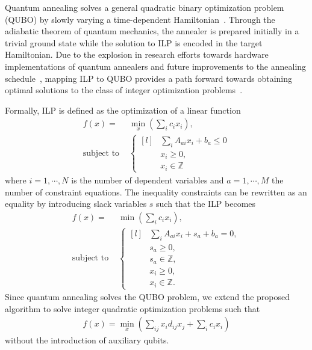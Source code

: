 \documentclass[prd,twocolumn,tightenlines,preprintnumbers,showpacs,superscriptaddress,notitlepage,nofootinbib,eqsecnum,
floatfix,longbibliography,aps,10pt]{revtex4-2}
\begin{document}
Quantum annealing solves a general quadratic binary optimization problem (QUBO) by slowly varying a time-dependent Hamiltonian~\cite{}. Through the adiabatic theorem of quantum mechanics, the annealer is prepared initially in a trivial ground state while the solution to ILP is encoded in the target Hamiltonian. Due to the explosion in research efforts towards hardware implementations of quantum annealers and future improvements to the annealing schedule~\cite{}, mapping ILP to QUBO provides a path forward towards obtaining optimal solutions to the class of integer optimization problems~\cite{2018Glover}.

Formally, ILP is defined as the optimization of a linear function
\begin{align}
f(x) = &\min\limits_{x}(\sum_i c_i x_i),\\
\textrm{subject to } &\left \{
\begin{matrix*}[l]
	&\sum_i A_{ai}x_i +b_a \leq 0 \\
	&x_i \geq 0,\\
	&x_i \in \mathbb{Z}
\end{matrix*} \right.
\end{align}
where $i=1, \cdots,  N$ is the number of dependent variables and $a=1, \cdots, M$ the number of constraint equations. The inequality constraints can be rewritten as an equality by introducing slack variables $s$ such that the ILP becomes
\begin{align}
f(x) = &\min(\sum_i c_i x_i),\\
\textrm{subject to } &\left \{
\begin{matrix*}[l]
	&\sum_i A_{a i}x_i + s_a + b_a = 0,\\
	&s_a \geq 0,\\
	&s_a \in \mathbb{Z},\\
	&x_i \geq 0,\\
	&x_i \in \mathbb{Z}.
\end{matrix*} \right.
\end{align}
Since quantum annealing solves the QUBO problem, we extend the proposed algorithm to solve integer quadratic optimization problems such that
\begin{align}
f(x) = \min\limits_{x}\left(\sum_{ij} x_i d_{ij} x_j + \sum_i c_i x_i\right)
\end{align}
without the introduction of auxiliary qubits.
\end{document}
